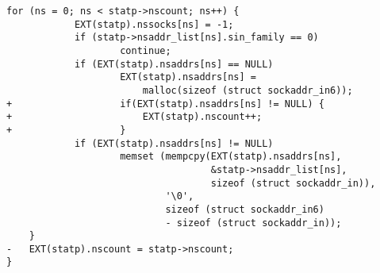 \begin{lstlisting}[firstnumber=426, label={lst:res_send.c}, caption={\texttt{resolv/res\_send.c}}]
    for (ns = 0; ns < statp->nscount; ns++) {
            EXT(statp).nssocks[ns] = -1;
            if (statp->nsaddr_list[ns].sin_family == 0)
                    continue;
            if (EXT(statp).nsaddrs[ns] == NULL)
                    EXT(statp).nsaddrs[ns] =
                        malloc(sizeof (struct sockaddr_in6));
+                   if(EXT(statp).nsaddrs[ns] != NULL) {
+                       EXT(statp).nscount++;
+                   }
            if (EXT(statp).nsaddrs[ns] != NULL)
                    memset (mempcpy(EXT(statp).nsaddrs[ns],
                                    &statp->nsaddr_list[ns],
                                    sizeof (struct sockaddr_in)),
                            '\0',
                            sizeof (struct sockaddr_in6)
                            - sizeof (struct sockaddr_in));
    }
-   EXT(statp).nscount = statp->nscount;
}
\end{lstlisting}